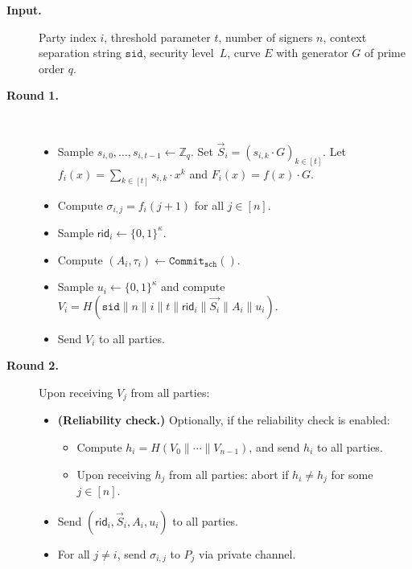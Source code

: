 \documentclass[11pt]{article}
\newcommand{\sid}{\ensuremath{\mathtt{sid}}}
\newcommand{\commit}[1]{\ensuremath{\mathtt{Commit}_{\mathtt{#1}}}}
\newcommand{\rid}{\textsf{rid}}
\newcommand{\Z}{\mathbb{Z}}
\newcommand{\?}[1]{\stackrel{?}{#1}}
\begin{document}
\begin{description}

  \item[\textbf{Input.}]
    Party index $i$,
    threshold parameter $t$,
    number of signers $n$,
    context separation string $\sid$,
    security level~$L$,
    curve $E$ with generator $G$ of prime order $q$.

  \item[\textbf{Round 1.}] \
    \begin{itemize}
      \item Sample $s_{i,0}, \ldots, s_{i,{t-1}} \gets \Z_q$. 
            Set $\vec S_i = (s_{i,k} \cdot G)_{k \in [t]}$.
            Let $f_i(x) = \sum_{k \in [t]} s_{i,k} \cdot x^k$ and $F_i(x) = f(x) \cdot G$.
      \item Compute $\sigma_{i,j} = f_i(j + 1)$ for all $j \in [n]$.
      \item Sample $\rid_i \gets \{0,1\}^\kappa$.
      \item Compute $(A_i, \tau_i) \gets \commit{sch}()$. %

      \item Sample $u_i \gets \{0,1\}^\kappa$
        and compute $V_i = H(\sid\| n\| i\| t\|\rid_i\| \vec{S_i}\| A_i\| u_i)$.
      \item Send $V_i$ to all parties.
    \end{itemize}


  \item[\textbf{Round 2.}] 
 Upon receiving $V_j$ from all parties:
    \begin{itemize}
      \item {\bf (Reliability check.)} Optionally, if the reliability check is enabled:
    \begin{itemize}
        \item 
        Compute $h_i = H(V_0 \| \cdots \| V_{n-1})$, and send $h_i$ to all parties.
        
        \item Upon receiving $h_j$ from all  parties: abort if 
        $h_i \neq h_j$ for some $j \in [n]$.
    \end{itemize}
      \item Send $(\rid_i, \vec{S}_i, A_i, u_i)$ to all parties.
      \item For all $j \neq i$, send $\sigma_{i,j}$ to $P_j$ via private channel.
    \end{itemize}


\end{description}
\end{document}
